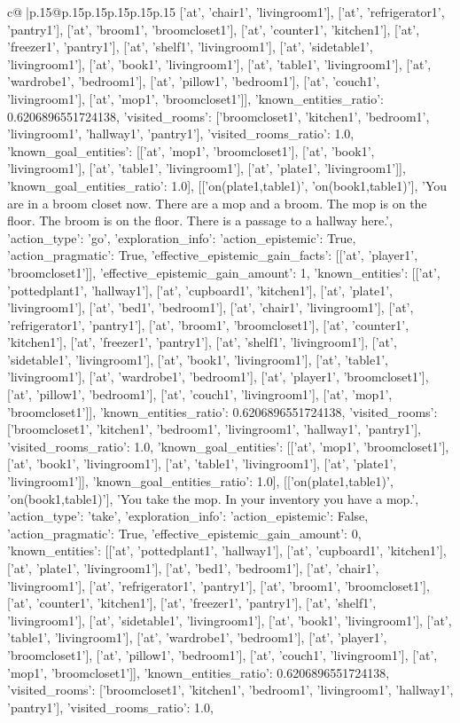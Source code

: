 \documentclass{article}
\begin{document}
{\begin{supertabular}{c@{$\;$}|p{.15\linewidth}@{}p{.15\linewidth}p{.15\linewidth}p{.15\linewidth}p{.15\linewidth}p{.15\linewidth}}
{{{['at', 'chair1', 'livingroom1'], ['at', 'refrigerator1', 'pantry1'], ['at', 'broom1', 'broomcloset1'], ['at', 'counter1', 'kitchen1'], ['at', 'freezer1', 'pantry1'], ['at', 'shelf1', 'livingroom1'], ['at', 'sidetable1', 'livingroom1'], ['at', 'book1', 'livingroom1'], ['at', 'table1', 'livingroom1'], ['at', 'wardrobe1', 'bedroom1'], ['at', 'pillow1', 'bedroom1'], ['at', 'couch1', 'livingroom1'], ['at', 'mop1', 'broomcloset1']], 'known_entities_ratio': 0.6206896551724138, 'visited_rooms': ['broomcloset1', 'kitchen1', 'bedroom1', 'livingroom1', 'hallway1', 'pantry1'], 'visited_rooms_ratio': 1.0, 'known_goal_entities': [['at', 'mop1', 'broomcloset1'], ['at', 'book1', 'livingroom1'], ['at', 'table1', 'livingroom1'], ['at', 'plate1', 'livingroom1']], 'known_goal_entities_ratio': 1.0}}], [['on(plate1,table1)', 'on(book1,table1)'], 'You are in a broom closet now. There are a mop and a broom. The mop is on the floor. The broom is on the floor. There is a passage to a hallway here.', {'action_type': 'go', 'exploration_info': {'action_epistemic': True, 'action_pragmatic': True, 'effective_epistemic_gain_facts': [['at', 'player1', 'broomcloset1']], 'effective_epistemic_gain_amount': 1, 'known_entities': [['at', 'pottedplant1', 'hallway1'], ['at', 'cupboard1', 'kitchen1'], ['at', 'plate1', 'livingroom1'], ['at', 'bed1', 'bedroom1'], ['at', 'chair1', 'livingroom1'], ['at', 'refrigerator1', 'pantry1'], ['at', 'broom1', 'broomcloset1'], ['at', 'counter1', 'kitchen1'], ['at', 'freezer1', 'pantry1'], ['at', 'shelf1', 'livingroom1'], ['at', 'sidetable1', 'livingroom1'], ['at', 'book1', 'livingroom1'], ['at', 'table1', 'livingroom1'], ['at', 'wardrobe1', 'bedroom1'], ['at', 'player1', 'broomcloset1'], ['at', 'pillow1', 'bedroom1'], ['at', 'couch1', 'livingroom1'], ['at', 'mop1', 'broomcloset1']], 'known_entities_ratio': 0.6206896551724138, 'visited_rooms': ['broomcloset1', 'kitchen1', 'bedroom1', 'livingroom1', 'hallway1', 'pantry1'], 'visited_rooms_ratio': 1.0, 'known_goal_entities': [['at', 'mop1', 'broomcloset1'], ['at', 'book1', 'livingroom1'], ['at', 'table1', 'livingroom1'], ['at', 'plate1', 'livingroom1']], 'known_goal_entities_ratio': 1.0}}], [['on(plate1,table1)', 'on(book1,table1)'], 'You take the mop. In your inventory you have a mop.', {'action_type': 'take', 'exploration_info': {'action_epistemic': False, 'action_pragmatic': True, 'effective_epistemic_gain_amount': 0, 'known_entities': [['at', 'pottedplant1', 'hallway1'], ['at', 'cupboard1', 'kitchen1'], ['at', 'plate1', 'livingroom1'], ['at', 'bed1', 'bedroom1'], ['at', 'chair1', 'livingroom1'], ['at', 'refrigerator1', 'pantry1'], ['at', 'broom1', 'broomcloset1'], ['at', 'counter1', 'kitchen1'], ['at', 'freezer1', 'pantry1'], ['at', 'shelf1', 'livingroom1'], ['at', 'sidetable1', 'livingroom1'], ['at', 'book1', 'livingroom1'], ['at', 'table1', 'livingroom1'], ['at', 'wardrobe1', 'bedroom1'], ['at', 'player1', 'broomcloset1'], ['at', 'pillow1', 'bedroom1'], ['at', 'couch1', 'livingroom1'], ['at', 'mop1', 'broomcloset1']], 'known_entities_ratio': 0.6206896551724138, 'visited_rooms': ['broomcloset1', 'kitchen1', 'bedroom1', 'livingroom1', 'hallway1', 'pantry1'], 'visited_rooms_ratio': 1.0, }}}
\end{supertabular}}
\end{document}
